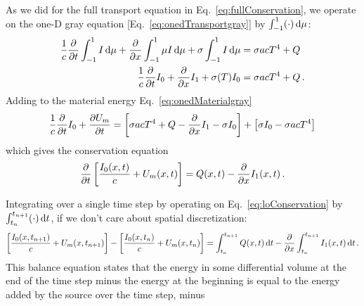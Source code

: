 \documentclass[11pt]{SRJresearch}
\begin{document}
As we did for the full transport equation in Eq.~\eqref{eq:fullConservation},
we operate on the one-D gray equation [Eq.~\eqref{eq:onedTransportgray}] by
$\int_{-1}^{1} (\cdot) \mathop{}\!\mathrm{d} \mu$:
\begin{align*}
  \frac{1}{c} \frac{\partial }{\partial t} \int_{-1}^{1} I \mathop{}\!\mathrm{d} \mu
  + \frac{\partial }{\partial x} \int_{-1}^{1}\mu I  \mathop{}\!\mathrm{d} \mu 
  +\sigma \int_{-1}^{1} I \mathop{}\!\mathrm{d} \mu 
  &= \sigma a c T^4 + Q
  \\
  \frac{1}{c} \frac{\partial }{\partial t} I_0
  + \frac{\partial }{\partial x} I_1
  +\sigma(T) I_0
  &= \sigma a c T^4 + Q \,.
\end{align*}
Adding to the material energy Eq.~\eqref{eq:onedMaterialgray}
\begin{equation*}
  \frac{1}{c} \frac{\partial }{\partial t} I_0
  + \frac{\partial U_m}{\partial t}
  = \left[ \sigma a c T^4 + Q
  - \frac{\partial }{\partial x} I_1
  - \sigma I_0\right]
  + \left[ \sigma I_0 - \sigma ac T^4 \right]
\end{equation*}
which gives the conservation equation
\begin{equation} \label{eq:loConservation}
   \frac{\partial }{\partial t} \left[ \frac{I_0(x,t)}{c} + U_m(x,t) \right]
   = Q(x,t) - \frac{\partial }{\partial x} I_1(x,t) \,.
\end{equation}

Integrating over a single time step by operating on
Eq.~\eqref{eq:loConservation} by $\int_{t_n}^{t_{n+1}} (\cdot) \mathop{}\!\mathrm{d} t$, if we
don't care about spatial discretization:
\begin{equation*}
  \left[ \frac{I_0(x,t_{n+1})}{c} + U_m(x,t_{n+1}) \right]
 - \left[ \frac{I_0(x,t_{n})}{c} + U_m(x,t_{n}) \right]
   = \int_{t_n}^{t_{n+1}} Q(x,t) \mathop{}\!\mathrm{d} t - \frac{\partial }{\partial x}\int_{t_n}^{t_{n+1}}  I_1(x,t) \mathop{}\!\mathrm{d} t\,.
\end{equation*}
This balance equation states that the energy in some differential volume at the
end of the time step minus the energy at the beginning is equal to the energy
added by the source over the time step, minus 
\end{document}
